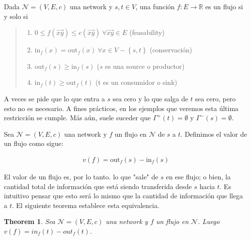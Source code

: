 \documentclass[a4paper]{article}
\newtheorem{theorem}{Theorem}
\newtheorem{theorem}{Theorem}
\begin{document}
\begin{definition}
    Dada $\mathcal{N} = (V, E, c)$ una network y $s, t \in V$, una función $f
    :E \to \mathbb{R}$ es un flujo si y solo si 

    \begin{quote}
        
    \begin{enumerate}
        \item $0 \leq f(\overrightarrow{xy}) \leq c(\overrightarrow{xy}) ~ \forall \overrightarrow{xy} \in E$
            (feasability)
        \item $\text{in}_f(x) = \text{out}_f(x) ~ \forall x \in V - \left\{ s, t
            \right\} $ (conservación) 
        \item $\text{out}_f(s) \geq \text{in}_f(s)$ ($s$ es una source o
            productor)
        \item $\text{in}_f(t) \geq \text{out}_f(t)$ (t es un consumidor o sink)
    \end{enumerate}
    \end{quote}

\end{definition}

A veces se pide que lo que entra a $s$ sea cero y lo que salga de $t$ sea cero,
pero esto no es necesario. A fines prácticos, en los ejemplos que veremos esta
última restricción se cumple. Más aún, suele suceder que $\Gamma^{+}(t) =
\emptyset$ y $\Gamma^{-}(s) =\emptyset$.

\begin{definition}
    Sea $\mathcal{N} = (V, E, c)$ una network y $f$ un flujo en $\mathcal{N}$
    de $s$ a $t$. Definimos el valor de un flujo como sigue:

    \begin{align*}
        v(f) = \text{out}_f(s) - \text{in}_f(s)
    \end{align*}
\end{definition}

El valor de un flujo es, por lo tanto. lo que "sale" de $s$ en ese flujo; o
bien, la cantidad total de información que está siendo transferida desde $s$
hacia $t$. Es intuitivo pensar que esto será lo mismo que la cantidad de
información que llega a $t$. El siguiente teorema establece esta equivalencia.

\begin{theorem}
    Sea $\mathcal{N} = (V, E, c)$ una network y $f$ un flujo en $\mathcal{N}$.
    Luego $v(f) = in_f(t) - out_f(t)$.
\end{theorem}
\end{document}

